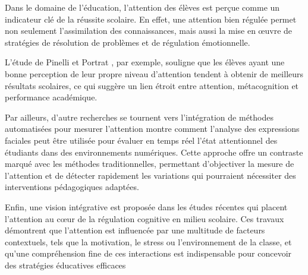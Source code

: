 Dans le domaine de l'éducation, l'attention des élèves est perçue comme un indicateur clé de la réussite scolaire. En effet, une attention bien régulée permet non seulement l'assimilation des connaissances, mais aussi la mise en œuvre de stratégies de résolution de problèmes et de régulation émotionnelle.

L'étude de Pinelli et Portrat \cite{Pinelli_Portrat_2023}, par exemple, souligne que les élèves ayant une bonne perception de leur propre niveau d'attention tendent à obtenir de meilleurs résultats scolaires, ce qui suggère un lien étroit entre attention, métacognition et performance académique.

Par ailleurs, d'autre recherches se tournent vers l'intégration de méthodes automatisées pour mesurer l'attention montre comment l'analyse des expressions faciales peut être utilisée pour évaluer en temps réel l'état attentionnel des étudiants dans des environnements numériques. Cette approche offre un contraste marqué avec les méthodes traditionnelles, permettant d'objectiver la mesure de l'attention et de détecter rapidement les variations qui pourraient nécessiter des interventions pédagogiques adaptées.

Enfin, une vision intégrative est proposée dans les études récentes qui placent l'attention au cœur de la régulation cognitive en milieu scolaire. Ces travaux démontrent que l'attention est influencée par une multitude de facteurs contextuels, tels que la motivation, le stress ou l'environnement de la classe, et qu'une compréhension fine de ces interactions est indispensable pour concevoir des stratégies éducatives efficaces \cite{ELBAZINI}
